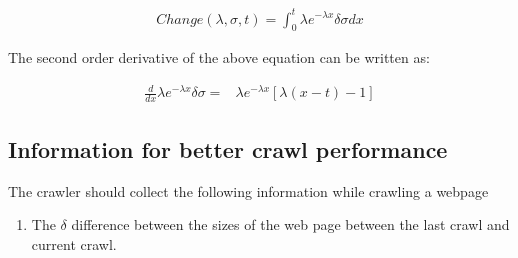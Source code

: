 \documentclass{article}
\begin{document}
\begin{align}
  \label{change_eq}
  Change(\lambda, \sigma, t) = \int_{0}^{t} \lambda e^{-\lambda x}\delta\sigma dx
\end{align}

The second order derivative of the above equation can be written as:

\begin{align}
  \label{cost_fn}
  \frac{d}{dx} \lambda e^{-\lambda x} \delta \sigma =& \lambda e^{-\lambda x} [ \lambda(x - t) - 1]
\end{align}

\subsection{Information for better crawl performance}
The crawler should collect the following information while crawling a webpage
\begin{enumerate}
  \item The $\delta $ difference between the sizes of the web page between the last crawl and current crawl.
\end{enumerate}
\end{document}
